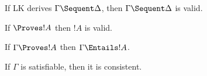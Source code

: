 \documentclass[../../include/open-logic-section]{subfiles}
\begin{document}


\begin{thm}
If LK derives $\Gamma \Sequent \Delta$, then $\Gamma \Sequent \Delta$
is valid.
\end{thm}

\begin{thm}
If $\Proves !A$ then $!A$ is valid.
\end{thm}

\begin{thm}
If $\Gamma \Proves !A$ then $\Gamma \Entails !A$.
\end{thm}

\begin{thm}
If $\Gamma$ is satisfiable, then it is consistent.
\end{thm}
\end{document}
